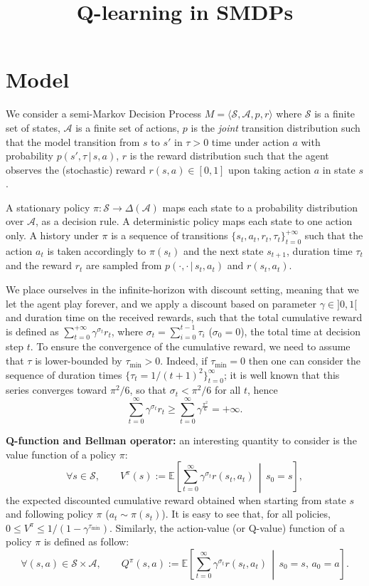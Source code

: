 \documentclass{article}
\title{Q-learning in SMDPs}
\begin{document}
\maketitle

\section{Model}

We consider a semi-Markov Decision Process $M = \langle \mathcal{S}, \mathcal{A}, p, r \rangle$ where $\mathcal{S}$ is a finite set of states, $\mathcal{A}$ is a finite set of actions, $p$ is the \textit{joint} transition distribution such that the model transition from $s$ to $s'$ in $\tau > 0$ time under action $a$ with probability $p(s', \tau \, | \, s, a)$, $r$ is the reward distribution such that the agent observes the (stochastic) reward $r(s, a) \in [0, 1]$ upon taking action $a$ in state $s$.

A stationary policy $\pi : \mathcal{S} \to \Delta(\mathcal{A})$ maps each state to a probability distribution over $\mathcal{A}$, as a decision rule. A deterministic policy maps each state to one action only. A history under $\pi$ is a sequence of transitions $\{s_t, a_t, r_t, \tau_t\}_{t = 0}^{+ \infty}$ such that the action $a_t$ is taken accordingly to $\pi(s_t)$ and the next state $s_{t+1}$, duration time $\tau_t$ and the reward $r_t$ are sampled from $p(\cdot, \cdot \, |\, s_t, a_t)$ and $r(s_t, a_t)$.

We place ourselves in the infinite-horizon with discount setting, meaning that we let the agent play forever, and we apply a discount based on parameter  $\gamma \in ]0, 1[$ and duration time on the received rewards, such that the total cumulative reward is defined as $\sum_{t = 0}^{+ \infty} \gamma^{\sigma_t} r_t$, where $\sigma_t = \sum_{i=0}^{t-1} \tau_i$ ($\sigma_0 = 0$), the total time at decision step $t$. To ensure the convergence of the cumulative reward, we need to assume that $\tau$ is lower-bounded by $\tau_{\min} > 0$. Indeed, if $\tau_{\min} = 0$ then one can consider the sequence of duration times $\{\tau_t = 1/(t + 1)^2\}_{t=0}^{\infty}$; it is well known that this series converges toward $\pi^2/6$, so that $\sigma_t < \pi^2/6$ for all $t$, hence $$\sum_{t = 0}^{\infty} \gamma^{\sigma_t} r_t \geq \sum_{t=0}^{\infty} \gamma^{\frac{\pi^2}{6}} = + \infty.$$

\textbf{Q-function and Bellman operator:} an interesting quantity to consider is the value function of a policy $\pi$:
$$\forall s \in \mathcal{S}, \qquad V^{\pi}(s) := \mathbb{E} \left[\sum_{t = 0}^{\infty} \gamma^{\sigma_{t}} r(s_t, a_t) \, \middle| \,  s_0 = s \right],$$
the expected discounted cumulative reward obtained when starting from state $s$ and following policy $\pi$ ($a_t \sim \pi(s_t)$). It is easy to see that, for all policies, $0 \leq V^{\pi} \leq 1/(1 - \gamma^{\tau_{\min}})$.  Similarly, the action-value (or Q-value) function of a policy $\pi$ is defined as follow:
$$\forall (s, a) \in \mathcal{S} \times \mathcal{A}, \qquad Q^{\pi}(s,a) := \mathbb{E} \left[\sum_{t = 0}^{\infty} \gamma^{\sigma_{t}} r(s_t, a_t) \, \middle| \,  s_0 = s,\, a_0 = a \right].$$
\end{document}
